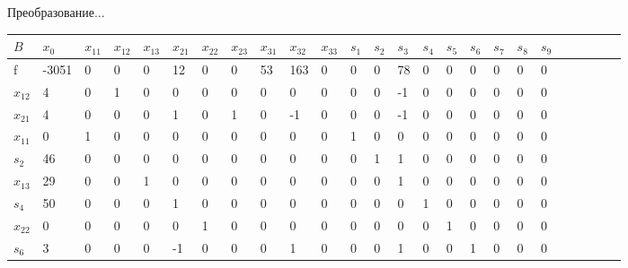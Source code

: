 \documentclass[a4paper]{article}
\theoremstyle{definition}
\theoremstyle{remark}
\begin{document}
Преобразование...
\begin{table}[h]
	\begin{tabular}{|l|l|l|l|l|l|l|l|l|l|l|l|l|l|l|l|l|l|l|l|l|l|l|l|l|}
		\hline
		$B$      & $x_0$ & $x_{11}$ & $x_{12}$ & $x_{13}$ & $x_{21}$ & $x_{22}$ & $x_{23}$ & $x_{31}$ & $x_{32}$ & $x_{33}$ & $s_1$ & $s_2$ & $s_3$ & $s_4$ & $s_5$ & $s_6$ & $s_7$ & $s_8$ & $s_9$ \\ \hline\hline
		f        & -3051 & 0        & 0        & 0        & 12       & 0        & 0        & 53       & 163      & 0        & 0     & 0     & 78    & 0     & 0     & 0     & 0     & 0     & 0     \\ \hline\hline
		$x_{12}$ & 4     & 0        & 1        & 0        & 0        & 0        & 0        & 0        & 0        & 0        & 0     & 0     & -1    & 0     & 0     & 0     & 0     & 0     & 0     \\ \hline
		$x_{21}$ & 4     & 0        & 0        & 0        & 1        & 0        & 1        & 0        & -1       & 0        & 0     & 0     & -1    & 0     & 0     & 0     & 0     & 0     & 0     \\ \hline
		$x_{11}$ & 0     & 1        & 0        & 0        & 0        & 0        & 0        & 0        & 0        & 0        & 1     & 0     & 0     & 0     & 0     & 0     & 0     & 0     & 0     \\ \hline
		$s_{2}$  & 46    & 0        & 0        & 0        & 0        & 0        & 0        & 0        & 0        & 0        & 0     & 1     & 1     & 0     & 0     & 0     & 0     & 0     & 0     \\ \hline
		$x_{13}$ & 29    & 0        & 0        & 1        & 0        & 0        & 0        & 0        & 0        & 0        & 0     & 0     & 1     & 0     & 0     & 0     & 0     & 0     & 0     \\ \hline
		$s_4$    & 50    & 0        & 0        & 0        & 1        & 0        & 0        & 0        & 0        & 0        & 0     & 0     & 0     & 1     & 0     & 0     & 0     & 0     & 0     \\ \hline
		$x_{22}$ & 0     & 0        & 0        & 0        & 0        & 1        & 0        & 0        & 0        & 0        & 0     & 0     & 0     & 0     & 1     & 0     & 0     & 0     & 0     \\ \hline
		$s_6$    & 3     & 0        & 0        & 0        & -1       & 0        & 0        & 0        & 1        & 0        & 0     & 0     & 1     & 0     & 0     & 1     & 0     & 0     & 0     \\ \hline

\end{tabular}
\end{table}
\end{document}

